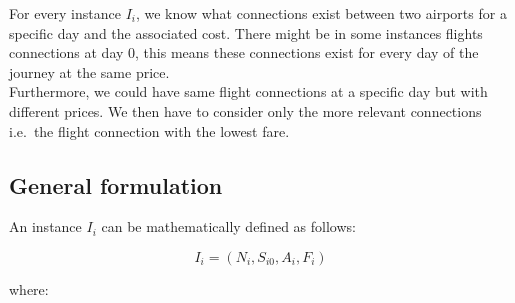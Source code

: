 For every instance $I_i$, we know what connections exist between two airports for a specific day and the associated cost.
There might be in some instances flights connections at day 0, this means these connections exist for every day of the journey at the same price.
\\Furthermore, we could have same flight connections at a specific day but with different prices. We then have to consider only the more relevant connections i.e.\ the flight connection with the lowest fare.

\subsection{General formulation}

An instance \(I_i\) can be mathematically defined as follows:

\[
I_i = (N_i, S_{i0}, A_{i}, F_{i})
\]

where:

